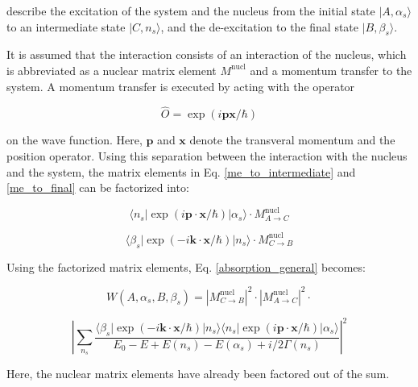 \documentclass{article}
\begin{document}
describe the excitation of the system and the nucleus from the initial state $| A, \alpha_s \rangle$ to an intermediate state $| C, n_s \rangle$, and the de-excitation to the final state $| B, \beta_s \rangle$.

It is assumed that the interaction consists of an interaction of the nucleus, which is abbreviated as a nuclear matrix element $M^{\mathrm{nucl}}$ and a momentum transfer to the system. 
A momentum transfer is executed by acting with the operator

\begin{equation}
	\hat{O} = \exp{\left(i \mathbf{p} \mathbf{x} / \hbar\right)}
\end{equation}

on the wave function. Here, $\mathbf{p}$ and $\mathbf{x}$ denote the transveral momentum and the position operator.
Using this separation between the interaction with the nucleus and the system, the matrix elements in Eq. \ref{me_to_intermediate} and \ref{me_to_final} can be factorized into:

\begin{equation}
\label{me_to_intermediate_factorized}
\langle n_s | \exp{\left( i \mathbf{p} \cdot \mathbf{x} / \hbar \right)} | \alpha_s \rangle \cdot M^{\mathrm{nucl}}_{A \to C}
\end{equation}

\begin{equation}
\label{me_to_final_factorized}
\langle \beta_s | \exp{\left( - i \mathbf{k} \cdot \mathbf{x} / \hbar \right)} | n_s \rangle \cdot M^{\mathrm{nucl}}_{C \to B}
\end{equation}

Using the factorized matrix elements, Eq. \ref{absorption_general} becomes:

\begin{equation}
\label{absorption_general_factorized}
	W (A, \alpha_s, B, \beta_s)= \left| M^{\mathrm{nucl}}_{C \to B} \right|^2 \cdot \left| M^{\mathrm{nucl}}_{A \to C} \right|^2 \cdot 
\end{equation}

\begin{equation*}
\left| \sum_{n_s} \frac{ \langle \beta_s | \exp{\left( - i \mathbf{k} \cdot \mathbf{x} / \hbar \right)} | n_s \rangle \langle n_s | \exp{\left( i \mathbf{p} \cdot \mathbf{x} / \hbar \right)} | \alpha_s \rangle  }{E_0 - E + E(n_s) - E(\alpha_s) + i/2 \Gamma(n_s)} \right| ^2
\end{equation*}

Here, the nuclear matrix elements have already been factored out of the sum.
\end{document}
